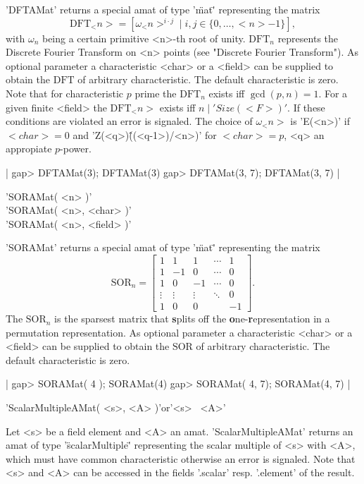 'DFTAMat' returns a special amat of type '\"mat\"' representing the 
matrix 
$$
\mbox{DFT}_<n> = [\omega_<n>^{i\cdot j}\mid i,j\in\{0,\dots,<n>-1\}],
$$ 
with $\omega_n$ being a certain primitive <n>-th root of unity.
$\mbox{DFT}_n$ represents the Discrete Fourier Transform on <n> 
points (see "Discrete Fourier Transform").
As optional parameter a characteristic <char> or a <field>
can be supplied to obtain the $\mbox{DFT}$ of arbitrary characteristic. 
The default characteristic is zero. Note that for characteristic 
$p$ prime the $\mbox{DFT}_n$ exists iff $\gcd(p, n) = 1$. For a given 
finite <field> the $\mbox{DFT}_<n>$ exists iff $n\mid'Size( <F> )'$. 
If these conditions are violated an error is signaled.
The choice of $\omega_<n>$ is 'E(<n>)' if $<char> = 0$ and
'Z(<q>)\^((<q-1>)/<n>)' for $<char> = p$, <q> an appropiate $p$-power.

|    gap> DFTAMat(3);
    DFTAMat(3)
    gap> DFTAMat(3, 7);
    DFTAMat(3, 7) |


'SORAMat( <n> )'\\
'SORAMat( <n>, <char> )'\\
'SORAMat( <n>, <field> )'

'SORAMat' returns a special amat of type '\"mat\"' representing the 
matrix 
$$
\mbox{SOR}_n = \left[
  \begin{array}{rrrrr}
  1 & 1 & 1 &\cdots & 1 \\
  1 & -1 & 0 & \cdots & 0 \\
  1 & 0 & -1 & \cdots & 0 \\
  \vdots & \vdots & \vdots& \ddots & 0 \\
  1 & 0 & 0 & & -1
  \end{array}\right].
$$
The $\mbox{SOR}_n$ is the sparsest matrix that {\bf s}plits off the
{\bf o}ne-{\bf r}epresentation in a permutation representation. As
optional parameter a characteristic <char> or a <field> can be
supplied to obtain the $\mbox{SOR}$ of arbitrary characteristic. The
default characteristic is zero.

|    gap> SORAMat( 4 );   
    SORAMat(4)
    gap> SORAMat( 4, 7); 
    SORAMat(4, 7) |


'ScalarMultipleAMat( <s>, <A> )'\quad or\quad '<s> \*\ <A>'

Let <s> be a field element and <A> an amat. 
'ScalarMultipleAMat' returns an amat of type '\"scalarMultiple\"'
representing the scalar multiple of <s> with <A>, which must have
common characteristic otherwise an error is signaled. 
Note that <s> and <A> can be accessed in the fields '.scalar'
resp. '.element' of the result.

